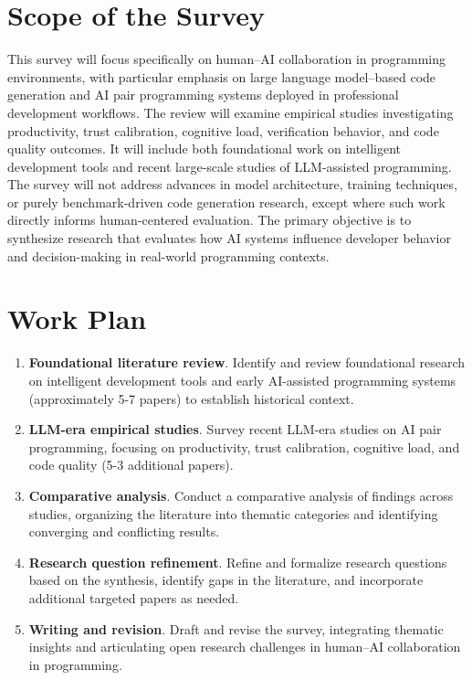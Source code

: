 \documentclass{article}      %
\begin{document}
\section*{Scope of the Survey}
This survey will focus specifically on human–AI collaboration in programming environments, with particular emphasis on large language model–based code generation and AI pair programming systems deployed in professional development workflows. The review will examine empirical studies investigating productivity, trust calibration, cognitive load, verification behavior, and code quality outcomes. It will include both foundational work on intelligent development tools and recent large-scale studies of LLM-assisted programming. The survey will not address advances in model architecture, training techniques, or purely benchmark-driven code generation research, except where such work directly informs human-centered evaluation. The primary objective is to synthesize research that evaluates how AI systems influence developer behavior and decision-making in real-world programming contexts.

\section*{Work Plan}
\begin{enumerate}[leftmargin=*, label=\textbf{Week \arabic*:}]
    \item \textbf{Foundational literature review}. Identify and review foundational research on intelligent development tools and early AI-assisted programming systems (approximately 5-7 papers) to establish historical context.
    \item \textbf{LLM-era empirical studies}. Survey recent LLM-era studies on AI pair programming, focusing on productivity, trust calibration, cognitive load, and code quality (5-3 additional papers).
    \item \textbf{Comparative analysis}. Conduct a comparative analysis of findings across studies, organizing the literature into thematic categories and identifying converging and conflicting results.
    \item \textbf{Research question refinement}. Refine and formalize research questions based on the synthesis, identify gaps in the literature, and incorporate additional targeted papers as needed.
    \item \textbf{Writing and revision}. Draft and revise the survey, integrating thematic insights and articulating open research challenges in human–AI collaboration in programming.
\end{enumerate}
\printbibliography
\end{document}
